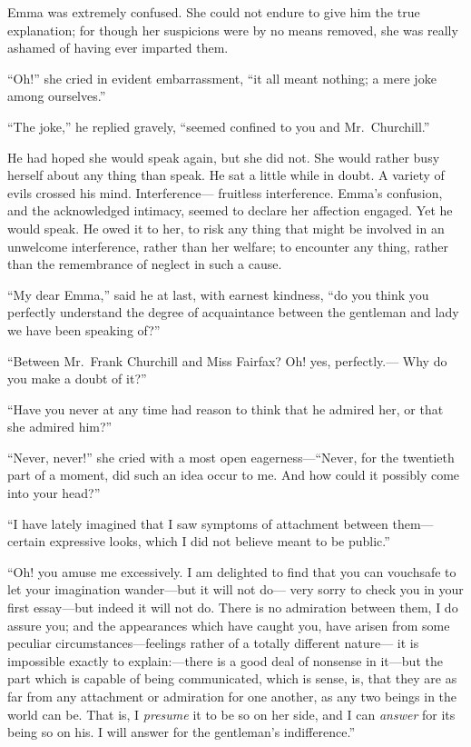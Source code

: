 Emma was extremely confused.  She could not endure to give him the
true explanation; for though her suspicions were by no means removed,
she was really ashamed of having ever imparted them.

``Oh!'' she cried in evident embarrassment, ``it all meant nothing;
a mere joke among ourselves.''

``The joke,'' he replied gravely, ``seemed confined to you
and Mr.\ Churchill.''

He had hoped she would speak again, but she did not.  She would
rather busy herself about any thing than speak.  He sat a little
while in doubt.  A variety of evils crossed his mind.  Interference---%
fruitless interference.  Emma's confusion, and the acknowledged intimacy,
seemed to declare her affection engaged.  Yet he would speak.
He owed it to her, to risk any thing that might be involved in
an unwelcome interference, rather than her welfare; to encounter
any thing, rather than the remembrance of neglect in such a cause.

``My dear Emma,'' said he at last, with earnest kindness, ``do you
think you perfectly understand the degree of acquaintance between
the gentleman and lady we have been speaking of?''

``Between Mr.\ Frank Churchill and Miss Fairfax?  Oh! yes, perfectly.---%
Why do you make a doubt of it?''

``Have you never at any time had reason to think that he admired her,
or that she admired him?''

``Never, never!'' she cried with a most open eagerness---``Never, for
the twentieth part of a moment, did such an idea occur to me.
And how could it possibly come into your head?''

``I have lately imagined that I saw symptoms of attachment between them---%
certain expressive looks, which I did not believe meant to be public.''

``Oh! you amuse me excessively.  I am delighted to find that you
can vouchsafe to let your imagination wander---but it will not do---%
very sorry to check you in your first essay---but indeed it will
not do.  There is no admiration between them, I do assure you;
and the appearances which have caught you, have arisen from some
peculiar circumstances---feelings rather of a totally different nature---%
it is impossible exactly to explain:---there is a good deal of
nonsense in it---but the part which is capable of being communicated,
which is sense, is, that they are as far from any attachment or
admiration for one another, as any two beings in the world can be.
That is, I \emph{presume} it to be so on her side, and I can \emph{answer} for its
being so on his.  I will answer for the gentleman's indifference.''

